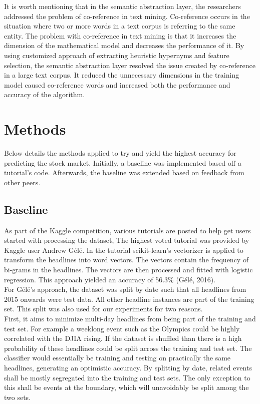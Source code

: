 \documentclass[11pt,a4paper]{article}
\begin{document}
It is worth mentioning that in the semantic abstraction layer, the researchers addressed the problem of co-reference in text mining. Co-reference occurs in the situation where two or more words in a text corpus is referring to the same entity. The problem with co-reference in text mining is that it increases the dimension of the mathematical model and decreases the performance of it. By using customized approach of extracting heuristic hypernyms and feature selection, the semantic abstraction layer resolved the issue created by co-reference in a large text corpus. It reduced the unnecessary dimensions in the training model caused co-reference words and increased both the performance and accuracy of the algorithm.\\


\section{Methods}
Below details the methods applied to try and yield the highest accuracy for predicting the stock market. Initially, a baseline was implemented based off a tutorial's code. Afterwards, the baseline was extended based on feedback from other peers.\\

\subsection{Baseline}
As part of the Kaggle competition, various tutorials are posted to help get users started with processing the dataset, The highest voted tutorial was provided by Kaggle user Andrew G\'el\'e. In the tutorial scikit-learn’s vectorizer is applied to transform the headlines into word vectors. The vectors contain the frequency of bi-grams in the headlines. The vectors are then processed and fitted with logistic regression. This approach yielded an accuracy of 56.3\% (G\'el\'e, 2016).\\

For G\'el\'e’s approach, the dataset was split by date such that all headlines from 2015 onwards were test data. All other headline instances are part of the training set. This split was also used for our experiments for two reasons.\\

First, it aims to minimize multi-day headlines from being part of the training and test set. For example a weeklong event such as the Olympics could be highly correlated with the DJIA rising. If the dataset is shuffled than there is a high probability of these headlines could be split across the training and test set. The classifier would essentially be training and testing on practically the same headlines, generating an optimistic accuracy. By splitting by date, related events shall be mostly segregated into the training and test sets. The only exception to this shall be events at the boundary, which will unavoidably be split among the two sets.\\
\end{document}
